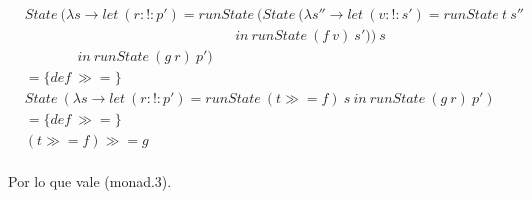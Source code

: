 \documentclass[11pt]{article}
\begin{document}
\begin{align*}
    &State\ (\lambda s \to let\ (r :\mathrel{!}: p') = runState\ (State\ (\lambda s'' \to let\ (v :\mathrel{!}: s') = runState\ t\ s''\ \\
    &\ \ \ \ \ \ \ \ \ \ \ \ \ \ \ \ \ \ \ \ \ \ \ \ \ \ \ \ \ \ \ \ \ \ \ \ \ \ \ \ \ \ \ \ \ \ \ \ \ \ \ \ \ \ \ \ \ \ \ \ \ \ \ \ \ \ \ \ in\ runState\ (f\ v)\ s'))\ s \\
    &\ \ \ \ \ \ \ \ \ \ \ \ \ \ \ \ \ in\ runState\ (g\ r)\ p') \\ 
    &= \{def\ \mathrel{\gg \! \! =} \}\\
    &State\ (\lambda s \to let\ (r :\mathrel{!}: p') = runState\ (t \mathrel{\gg \! \! =} f)\ s\ in\ runState\ (g\ r)\ p')\\ 
    &= \{def\ \mathrel{\gg \! \! =} \}\\
    &(t \mathrel{\gg \! \! =} f) \mathrel{\gg \! \! =} g\\
\end{align*}

\vspace{2mm}

Por lo que vale (monad.3).

\vspace{10cm}


\end{document}
